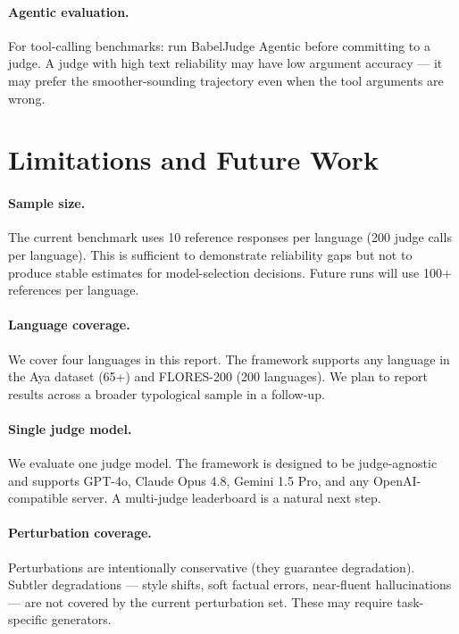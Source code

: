 \documentclass[11pt]{article}
\begin{document}
\paragraph{Agentic evaluation.}
For tool-calling benchmarks: run BabelJudge Agentic before committing to a judge. A judge with high text reliability may have low argument accuracy — it may prefer the smoother-sounding trajectory even when the tool arguments are wrong.

\section{Limitations and Future Work}
\label{sec:limitations}

\paragraph{Sample size.}
The current benchmark uses 10 reference responses per language (200 judge calls per language). This is sufficient to demonstrate reliability gaps but not to produce stable estimates for model-selection decisions. Future runs will use 100+ references per language.

\paragraph{Language coverage.}
We cover four languages in this report. The framework supports any language in the Aya dataset (65+) and FLORES-200 (200 languages). We plan to report results across a broader typological sample in a follow-up.

\paragraph{Single judge model.}
We evaluate one judge model. The framework is designed to be judge-agnostic and supports GPT-4o, Claude Opus 4.8, Gemini 1.5 Pro, and any OpenAI-compatible server. A multi-judge leaderboard is a natural next step.

\paragraph{Perturbation coverage.}
Perturbations are intentionally conservative (they guarantee degradation). Subtler degradations — style shifts, soft factual errors, near-fluent hallucinations — are not covered by the current perturbation set. These may require task-specific generators.
\end{document}
